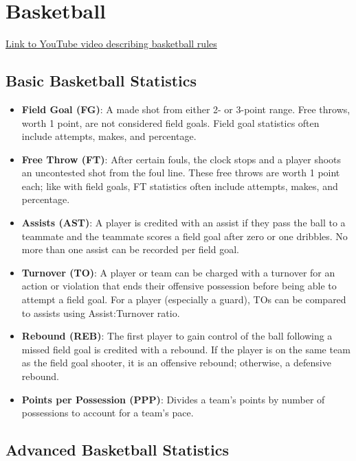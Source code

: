 \documentclass[
  11pt,
]{book}
\theoremstyle{definition}
\theoremstyle{definition}
\theoremstyle{definition}
\theoremstyle{definition}
\theoremstyle{remark}
\begin{document}
\newpage

\hypertarget{basketball}{%
\section{Basketball}\label{basketball}}

\href{https://www.youtube.com/watch?v=wYjp2zoqQrs}{Link to YouTube video describing basketball rules}

\hypertarget{basic-basketball-statistics}{%
\subsection{Basic Basketball Statistics}\label{basic-basketball-statistics}}

\begin{itemize}
\item
  \textbf{Field Goal (FG)}: A made shot from either 2- or 3-point range. Free throws, worth 1 point, are not considered field goals. Field goal statistics often include attempts, makes, and percentage.
\item
  \textbf{Free Throw (FT)}: After certain fouls, the clock stops and a player shoots an uncontested shot from the foul line. These free throws are worth 1 point each; like with field goals, FT statistics often include attempts, makes, and percentage.
\item
  \textbf{Assists (AST)}: A player is credited with an assist if they pass the ball to a teammate and the teammate scores a field goal after zero or one dribbles. No more than one assist can be recorded per field goal.
\item
  \textbf{Turnover (TO)}: A player or team can be charged with a turnover for an action or violation that ends their offensive possession before being able to attempt a field goal. For a player (especially a guard), TOs can be compared to assists using Assist:Turnover ratio.
\item
  \textbf{Rebound (REB)}: The first player to gain control of the ball following a missed field goal is credited with a rebound. If the player is on the same team as the field goal shooter, it is an offensive rebound; otherwise, a defensive rebound.
\item
  \textbf{Points per Possession (PPP)}: Divides a team's points by number of possessions to account for a team's pace.
\end{itemize}

\hypertarget{advanced-basketball-statistics}{%
\subsection{Advanced Basketball Statistics}\label{advanced-basketball-statistics}}
\end{document}
